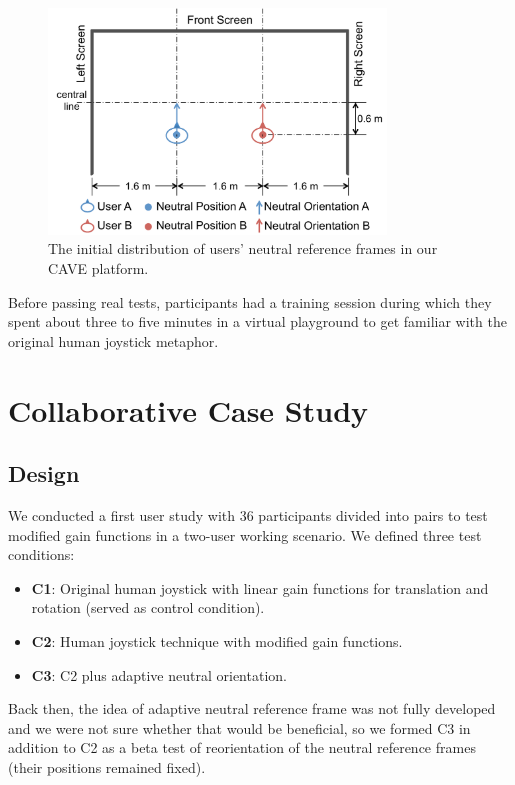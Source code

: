 \begin{figure}[tb]
  \centering
  \includegraphics[width=0.8\textwidth]{figures/ch4/initial_config}
  \caption{\label{fig:4_initial_config}The initial distribution of users' neutral reference frames in our CAVE platform.}
\end{figure}

Before passing real tests, participants had a training session during which they spent about three to five minutes in a virtual playground to get familiar with the original human joystick metaphor.

\section{Collaborative Case Study}
\subsection{Design}
We conducted a first user study \citep{Chen2015Cohab} with 36 participants divided into pairs to test modified gain functions in a two-user working scenario. We defined three test conditions:

\begin{itemize}
  \item \textbf{C1}: Original human joystick with linear gain functions for translation and rotation (served as control condition).
  \item \textbf{C2}: Human joystick technique with modified gain functions.
  \item \textbf{C3}: C2 plus adaptive neutral orientation.
\end{itemize}

Back then, the idea of adaptive neutral reference frame was not fully developed and we were not sure whether that would be beneficial, so we formed C3 in addition to C2 as a beta test of reorientation of the neutral reference frames (their positions remained fixed).


